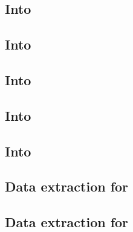 \subsection{Into \wcpMod{}                        }        \label{rlp auth: lookup: into wcp}                    %
\subsection{Into \rlpUtilsMod{}                   }        \label{rlp auth: lookup: into rlp utils}              %
\subsection{Into \userTxnDataMod{}                }        \label{rlp auth: lookup: into txn data}               %
\subsection{Into \btcMod{}                        }        \label{rlp auth: lookup: into block data}             %
\subsection{Into \hubMod{}                        }        \label{rlp auth: lookup: into hub}                    %
\subsection{Data extraction for \macroEcrecover{} }        \label{rlp auth: lookup: extraction for ecrecover}    %
\subsection{Data extraction for      }        \label{rlp auth: lookup: extraction for keccak}       %
